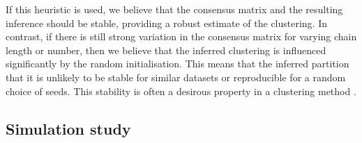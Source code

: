 \documentclass{bioinfo}
\begin{document}

If this heuristic is used, we believe that the consensus matrix and the resulting inference should be stable, providing a robust estimate of the clustering. In contrast, if there is still strong variation in the consensus matrix for varying chain length or number, then we believe that the inferred clustering is influenced significantly by the random initialisation. This means that the inferred partition that it is unlikely to be stable for similar datasets or reproducible for a random choice of seeds. This stability is often a desirous property in a clustering method \citep{von2005towards, meinshausen2010stability}.

\subsection{Simulation study}
\end{document}
